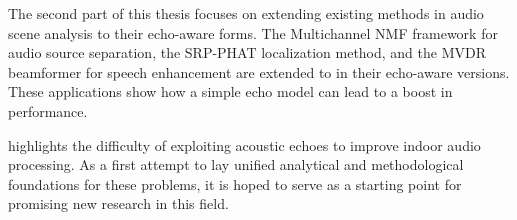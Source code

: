 \mynewline
The second part of this thesis focuses on extending existing methods in audio scene analysis to their echo-aware forms.
The Multichannel NMF framework for audio source separation, the SRP-PHAT localization method, and the MVDR beamformer for speech enhancement are extended to in their echo-aware versions.
These applications show how a simple echo model can lead to a boost in performance.

 highlights the difficulty of exploiting acoustic echoes to improve indoor audio processing.
As a first attempt to lay unified analytical and methodological foundations for these problems, it is hoped to serve as a starting point for promising new research in this field.
